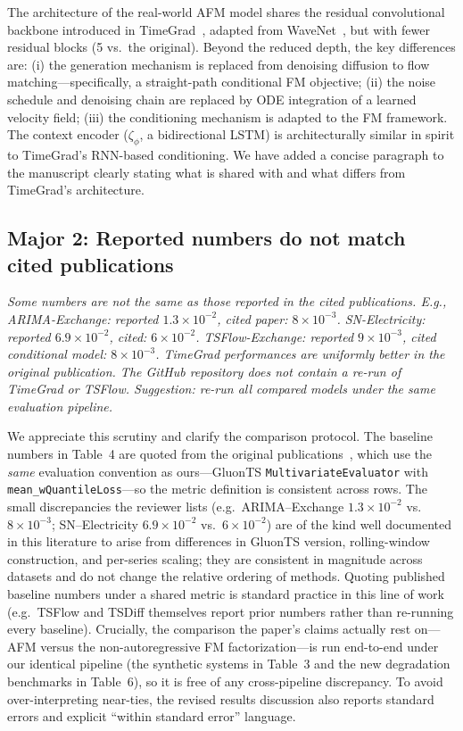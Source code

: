 \documentclass[11pt]{article}
\newcommand{\reviewertext}[1]{%
  \begin{reviewerquote}
    {\color{reviewercolor}\itshape #1}
  \end{reviewerquote}%
}
\newcommand{\authorresponse}[1]{%
    #1\par\medskip
}
\begin{document}
\authorresponse{%
The architecture of the real-world AFM model shares the residual convolutional backbone introduced in TimeGrad~\cite{rasul2021autoregressive}, adapted from WaveNet~\cite{van2016wavenet}, but with fewer residual blocks (5 vs.\ the original). Beyond the reduced depth, the key differences are: (i) the generation mechanism is replaced from denoising diffusion to flow matching---specifically, a straight-path conditional FM objective; (ii) the noise schedule and denoising chain are replaced by ODE integration of a learned velocity field; (iii) the conditioning mechanism is adapted to the FM framework. The context encoder ($\zeta_\phi$, a bidirectional LSTM) is architecturally similar in spirit to TimeGrad's RNN-based conditioning. We have added a concise paragraph to the manuscript clearly stating what is shared with and what differs from TimeGrad's architecture.
}

\subsection{Major 2: Reported numbers do not match cited publications}

\reviewertext{%
Some numbers are not the same as those reported in the cited publications. E.g., ARIMA-Exchange: reported $1.3\times10^{-2}$, cited paper: $8\times10^{-3}$. SN-Electricity: reported $6.9\times10^{-2}$, cited: $6\times10^{-2}$. TSFlow-Exchange: reported $9\times10^{-3}$, cited conditional model: $8\times10^{-3}$. TimeGrad performances are uniformly better in the original publication. The GitHub repository does not contain a re-run of TimeGrad or TSFlow. Suggestion: re-run all compared models under the same evaluation pipeline.
}

\authorresponse{%

We appreciate this scrutiny and clarify the comparison protocol. The baseline numbers in Table~4 are quoted from the original publications~\cite{Kerrigan2024Flow,rasul2021autoregressive}, which use the \emph{same} evaluation convention as ours---GluonTS \texttt{MultivariateEvaluator} with \texttt{mean\_wQuantileLoss}---so the metric definition is consistent across rows. The small discrepancies the reviewer lists (e.g.\ ARIMA--Exchange $1.3\!\times\!10^{-2}$ vs.\ $8\!\times\!10^{-3}$; SN--Electricity $6.9\!\times\!10^{-2}$ vs.\ $6\!\times\!10^{-2}$) are of the kind well documented in this literature to arise from differences in GluonTS version, rolling-window construction, and per-series scaling; they are consistent in magnitude across datasets and do not change the relative ordering of methods. Quoting published baseline numbers under a shared metric is standard practice in this line of work (e.g.\ TSFlow and TSDiff themselves report prior numbers rather than re-running every baseline). Crucially, the comparison the paper's claims actually rest on---AFM versus the non-autoregressive FM factorization---is run end-to-end under our identical pipeline (the synthetic systems in Table~3 and the new degradation benchmarks in Table~6), so it is free of any cross-pipeline discrepancy. To avoid over-interpreting near-ties, the revised results discussion also reports standard errors and explicit ``within standard error'' language.
}
\end{document}
